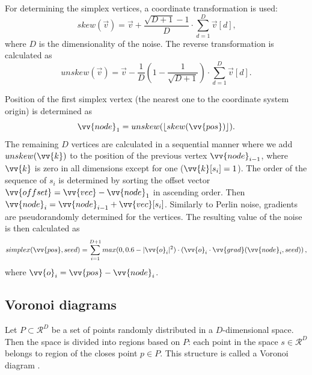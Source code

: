 For determining the simplex vertices, a coordinate transformation is used:
\begin{equation}
	skew(\vec{v}) = \vec{v} + \dfrac{\sqrt{D + 1} - 1}{D} \cdot \sum_{d = 1}^{D} \vec{v}[d] \text{,}
\end{equation}
where $D$ is the dimensionality of the noise. The reverse transformation is calculated as
\begin{equation}
	unskew(\vec{v}) = \vec{v} - \dfrac{1}{D} \left(1 - \dfrac{1}{\sqrt{D + 1}}\right) \cdot \sum_{d = 1}^{D} \vec{v}[d] \text{.}
\end{equation}

Position of the first simplex vertex (the nearest one to the coordinate system origin) is determined as
\begin{equation}
	\vv{node}_1 = unskew(\lfloor skew(\vv{pos}) \rfloor) \text{.}
\end{equation}
The remaining $D$ vertices are calculated in a sequential manner where we add $unskew(\vv{k})$ to the position of the previous vertex $\vv{node}_{i-1}$, where $\vv{k}$ is zero in all dimensions except for one ($\vv{k}[s_i] = 1$). The order of the sequence of $s_i$ is determined by sorting the offset vector $\vv{offset} = \vv{vec} - \vv{node}_1$ in ascending order. Then $\vv{node}_i = \vv{node}_{i-1} + \vv{vec}[s_i]$. Similarly to Perlin noise, gradients are pseudorandomly determined for the vertices. The resulting value of the noise is then calculated as
\begin{equation}
	simplex(\vv{pos}, seed) = \sum_{i=1}^{D+1} max(0, 0.6 - |\vv{o}_i|^2) \cdot \left( \vv{o}_i \cdot \vv{grad}(\vv{node}_i, seed) \right) \text{,}
\end{equation}
where $\vv{o}_i = \vv{pos} - \vv{node}_i$.

\subsection{Voronoi diagrams} \label{voronoiDiagrams}
Let $P \subset \mathcal{R}^D$ be a set of points randomly distributed in a $D$-dimensional space. Then the space is divided into regions based on $P$: each point in the space $s \in \mathcal{R}^D$ belongs to region of the closes point $p \in P$. This structure is called a Voronoi diagram \cite{Boissonnat2010}.

